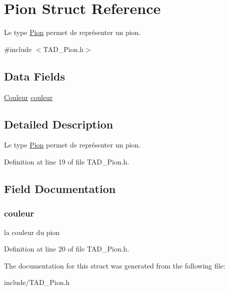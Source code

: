 \hypertarget{struct_pion}{}\section{Pion Struct Reference}
\label{struct_pion}


Le type \hyperlink{struct_pion}{Pion} permet de représenter un pion.  




{\ttfamily \#include $<$T\+A\+D\+\_\+\+Pion.\+h$>$}

\subsection*{Data Fields}
\begin{DoxyCompactItemize}
\item 
\hyperlink{_t_a_d___couleur_8h_aa304d0ca681f782b1d7735da33037dd7}{Couleur} \hyperlink{struct_pion_af0e152d09c13944935e00bef7a3c5111}{couleur}
\end{DoxyCompactItemize}


\subsection{Detailed Description}
Le type \hyperlink{struct_pion}{Pion} permet de représenter un pion. 

Definition at line 19 of file T\+A\+D\+\_\+\+Pion.\+h.



\subsection{Field Documentation}
\hypertarget{struct_pion_af0e152d09c13944935e00bef7a3c5111}{}
\subsubsection[{couleur}]{ couleur}\label{struct_pion_af0e152d09c13944935e00bef7a3c5111}
la couleur du pion 

Definition at line 20 of file T\+A\+D\+\_\+\+Pion.\+h.



The documentation for this struct was generated from the following file\+:\begin{DoxyCompactItemize}
\item 
include/T\+A\+D\+\_\+\+Pion.\+h\end{DoxyCompactItemize}
